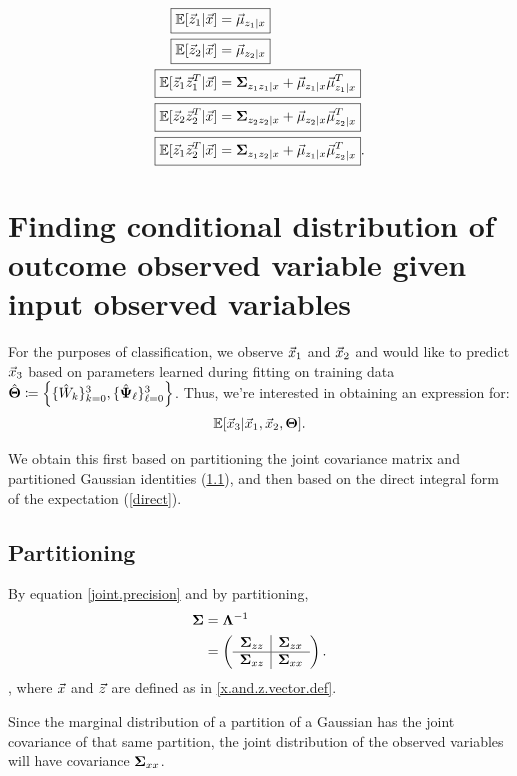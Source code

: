 \begin{align}
 \Aboxed{ \ev[\z_1| \x] &=  \vmu_{z_1 |x} } \label{postexp:1} \\
\Aboxed{  \ev[\z_2| \x] &=  \vmu_{z_2 |x} }\\
\Aboxed{  \ev[\z_1\z_1^T | \x] &= \bSigma_{z_1z_1|x} +
                         \vmu_{z_1|x}\vmu_{z_1|x}^T}\\
\Aboxed{    \ev[\z_2\z_2^T | \x] &= \bSigma_{z_2z_2|x} +
                           \vmu_{z_2|x}\vmu_{z_2|x}^T }\\
\Aboxed{      \ev[\z_1\z_2^T | \x] &= \bSigma_{z_1z_2|x} + \vmu_{z_1|x}\vmu_{z_2|x}^T                }\label{postexp:5}
.\end{align}


\pagebreak %
\section{Finding conditional distribution of outcome observed variable
  given input observed variables}
For the purposes of classification, we observe $\vec{x}_1$ and $\vec{x}_2$ and
would like to predict $\vec{x}_3$ based on parameters learned during
fitting on training data $\hat{\bold{\Theta}} \coloneqq \left\{ \{\hat{W}_k\}_{k=0}^3 ,
  \{\hat{\bold{\Psi}}_\ell\}_{\ell=0}^3  \right\}$. Thus, we're interested in
obtaining an expression for:
\begin{align}
\mathbb{E} [ \vec{x}_3 | \vec{x}_1, \vec{x}_2, \bold{\Theta}]
.\end{align}

We obtain this first based on partitioning the joint covariance matrix and
partitioned Gaussian identities (\ref{partitioning}), and then based on the direct integral form of the expectation (\ref{direct}).
\subsection{Partitioning} \label{partitioning}
By equation \ref{joint.precision} and by partitioning, 
\begin{align}
  \bold{\Sigma} &=  \bold{\Lambda}^{-1} \\
&= \left(
  \begin{array}{c|c}
      \bold{\Sigma}_{zz} & \bold{\Sigma}_{zx} \\ \hline
      \bold{\Sigma}_{xz} & \bold{\Sigma}_{xx} \\
  \end{array}
  \right) 
.\end{align}, where $\vec{x}$ and $\vec{z}$ are defined as in \ref{x.and.z.vector.def}.


Since the marginal distribution of a partition of a Gaussian has
the joint covariance of that same partition, the joint distribution
of the observed variables will have covariance $\bold{\Sigma}_{xx}$. 



